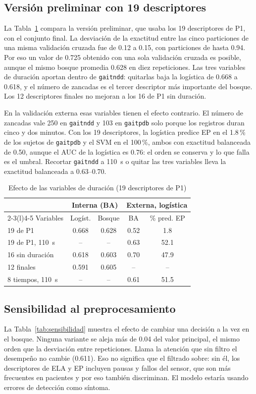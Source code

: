 \documentclass[conference]{IEEEtran}
\newcommand{\gaitndd}{\texttt{gaitndd}}
\newcommand{\gaitpdb}{\texttt{gaitpdb}}
\begin{document}
\subsection{Versión preliminar con 19 descriptores}
La Tabla~\ref{tab:p1} compara la versión preliminar, que usaba los 19 descriptores de P1, con el conjunto final. La desviación de la exactitud entre las cinco particiones de una misma validación cruzada fue de 0.12 a 0.15, con particiones de hasta 0.94. Por eso un valor de 0.725 obtenido con una sola validación cruzada es posible, aunque el mismo bosque promedia 0.628 en diez repeticiones. Las tres variables de duración aportan dentro de \gaitndd{}: quitarlas baja la logística de 0.668 a 0.618, y el número de zancadas es el tercer descriptor más importante del bosque. Los 12 descriptores finales no mejoran a los 16 de P1 sin duración.

En la validación externa esas variables tienen el efecto contrario. El número de zancadas vale 250 en \gaitndd{} y 103 en \gaitpdb{} solo porque los registros duran cinco y dos minutos. Con los 19 descriptores, la logística predice EP en el 1.8\,\% de los sujetos de \gaitpdb{} y el SVM en el 100\,\%, ambos con exactitud balanceada de 0.50, aunque el AUC de la logística es 0.76: el orden se conserva y lo que falla es el umbral. Recortar \gaitndd{} a 110~s o quitar las tres variables lleva la exactitud balanceada a 0.63--0.70.

\begin{table}[t]
\caption{Efecto de las variables de duración (19 descriptores de P1)}
\label{tab:p1}
\centering
\footnotesize
\begin{tabular}{@{}lcccc@{}}
\toprule
 & \multicolumn{2}{c}{Interna (BA)} & \multicolumn{2}{c}{Externa, logística} \\
\cmidrule(lr){2-3}\cmidrule(l){4-5}
Variables & Logíst. & Bosque & BA & \% pred. EP \\
\midrule
19 de P1 & 0.668 & 0.628 & 0.52 & 1.8 \\
19 de P1, 110~s & -- & -- & 0.63 & 52.1 \\
16 sin duración & 0.618 & 0.603 & 0.70 & 47.9 \\
12 finales & 0.591 & 0.605 & -- & -- \\
8 tiempos, 110~s & -- & -- & 0.61 & 51.5 \\
\bottomrule
\end{tabular}
\end{table}

\subsection{Sensibilidad al preprocesamiento}
La Tabla~\ref{tab:sensibilidad} muestra el efecto de cambiar una decisión a la vez en el bosque. Ninguna variante se aleja más de 0.04 del valor principal, el mismo orden que la desviación entre repeticiones. Llama la atención que sin filtro el desempeño no cambie (0.611). Eso no significa que el filtrado sobre: sin él, los descriptores de ELA y EP incluyen pausas y fallos del sensor, que son más frecuentes en pacientes y por eso también discriminan. El modelo estaría usando errores de detección como síntoma.
\end{document}
